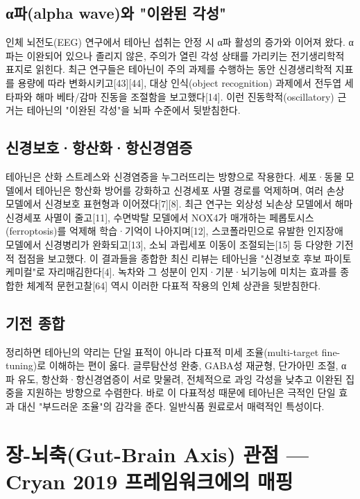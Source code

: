 \documentclass[12pt,oneside]{book}
\begin{document}
\subsection{α파(alpha wave)와 "이완된 각성"}

인체 뇌전도(EEG) 연구에서 테아닌 섭취는 안정 시 α파 활성의 증가와 이어져 왔다. α파는 이완되어 있으나 졸리지 않은, 주의가 열린 각성 상태를 가리키는 전기생리학적 표지로 읽힌다. 최근 연구들은 테아닌이 주의 과제를 수행하는 동안 신경생리학적 지표를 용량에 따라 변화시키고[43][44], 대상 인식(object recognition) 과제에서 전두엽 세타파와 해마 베타/감마 진동을 조절함을 보고했다[14]. 이런 진동학적(oscillatory) 근거는 테아닌의 "이완된 각성"을 뇌파 수준에서 뒷받침한다.

\subsection{신경보호·항산화·항신경염증}

테아닌은 산화 스트레스와 신경염증을 누그러뜨리는 방향으로 작용한다. 세포·동물 모델에서 테아닌은 항산화 방어를 강화하고 신경세포 사멸 경로를 억제하며, 여러 손상 모델에서 신경보호 표현형과 이어졌다[7][8]. 최근 연구는 외상성 뇌손상 모델에서 해마 신경세포 사멸이 줄고[11], 수면박탈 모델에서 NOX4가 매개하는 페롭토시스(ferroptosis)를 억제해 학습·기억이 나아지며[12], 스코폴라민으로 유발한 인지장애 모델에서 신경병리가 완화되고[13], 소뇌 과립세포 이동이 조절되는[15] 등 다양한 기전적 접점을 보고했다. 이 결과들을 종합한 최신 리뷰는 테아닌을 "신경보호 후보 파이토케미컬"로 자리매김한다[4]. 녹차와 그 성분이 인지·기분·뇌기능에 미치는 효과를 종합한 체계적 문헌고찰[64] 역시 이러한 다표적 작용의 인체 상관을 뒷받침한다.

\subsection{기전 종합}

정리하면 테아닌의 약리는 단일 표적이 아니라 다표적 미세 조율(multi-target fine-tuning)로 이해하는 편이 옳다. 글루탐산성 완충, GABA성 재균형, 단가아민 조절, α파 유도, 항산화·항신경염증이 서로 맞물려, 전체적으로 과잉 각성을 낮추고 이완된 집중을 지원하는 방향으로 수렴한다. 바로 이 다표적성 때문에 테아닌은 극적인 단일 효과 대신 "부드러운 조율"의 감각을 준다. 일반식품 원료로서 매력적인 특성이다.

\section{장-뇌축(Gut-Brain Axis) 관점 — Cryan 2019 프레임워크에의 매핑}
\end{document}
